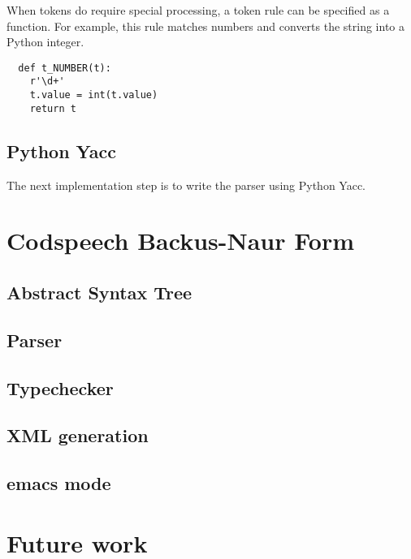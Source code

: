 When tokens do require special processing, a token rule can be
specified as a function. For example, this rule matches numbers and
converts the string into a Python integer.
\begin{lstlisting}
  def t_NUMBER(t):
    r'\d+'
    t.value = int(t.value)
    return t
\end{lstlisting}


\subsection{Python Yacc}
The next implementation step is to write the parser using Python Yacc.

\section{Codspeech Backus-Naur Form}


\subsection{Abstract Syntax Tree}
\subsection{Parser}
\subsection{Typechecker}
\subsection{XML generation}
\subsection{emacs mode}


\section{Future work}
